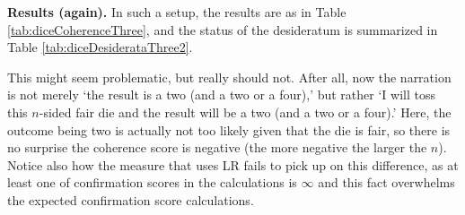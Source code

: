 \documentclass[
  10pt,
]{scrartcl}
\begin{document}
\textbf{Results (again).} In such a setup, the results are as in Table \ref{tab:diceCoherenceThree}, and the status of the desideratum is summarized in Table \ref{tab:diceDesiderataThree2}.

\begin{table}[H]

\caption{\label{tab:diceCoherenceThree}Coherence scores for a regular die and a dodecahedron in the dice problem with three nodes (rounded).}
\centering
{}
\end{table}

\begin{table}[H]

\caption{\label{tab:diceDesiderataThree2}Desideratum satisfaction for three-node BNs in the dice problem.}
\centering
{}
\end{table}

\noindent This might seem problematic, but really should not. After all, now the narration is not merely `the result is a two (and a two or a four),' but rather `I will toss this \(n\)-sided fair die and the result will be a two (and a two or a four).' Here, the outcome being two is actually not too likely given that the die is fair, so there is no surprise the coherence score is negative (the more negative the larger the \(n\)). Notice also how the measure that uses LR fails to pick up on this difference, as at least one of confirmation scores in the calculations is \(\infty\) and this fact overwhelms the expected confirmation score calculations.
\end{document}
